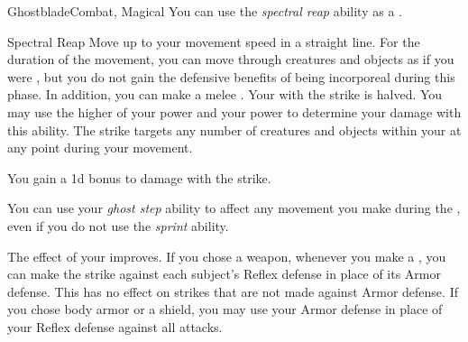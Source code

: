 \begin{feat}{Ghostblade}{Combat, Magical}
         You can use the \textit{spectral reap} ability as a .
        \begin{durationability}{Spectral Reap}
            \rankline
            Move up to your movement speed in a straight line.
            For the duration of the movement, you can move through creatures and objects as if you were , but you do not gain the defensive benefits of being incorporeal during this phase.
            In addition, you can make a melee .
            Your  with the strike is halved.
            You may use the higher of your  power and your  power to determine your damage with this ability.
            The strike targets any number of creatures and objects within your  at any point during your movement.

            \rankline
             You gain a \plus1d bonus to damage with the strike.
        \end{durationability}

         You can use your \textit{ghost step} ability to affect any movement you make during the , even if you do not use the \textit{sprint} ability.

         The effect of your  improves.
        If you chose a weapon, whenever you make a , you can make the strike against each subject's Reflex defense in place of its Armor defense.
        This has no effect on strikes that are not made against Armor defense.
        If you chose body armor or a shield, you may use your Armor defense in place of your Reflex defense against all attacks.
    \end{feat}

